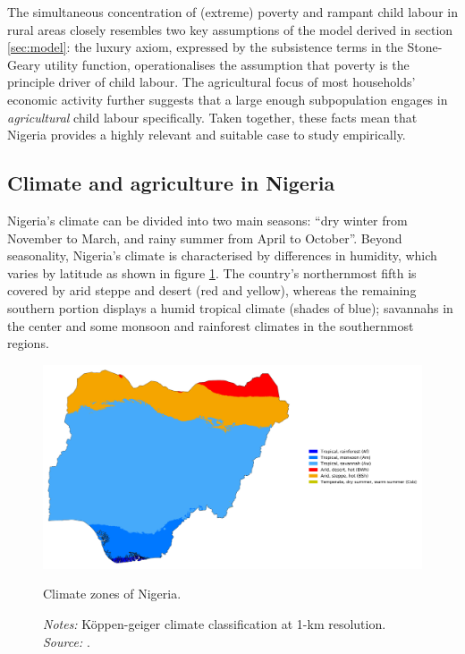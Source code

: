 \documentclass[a4paper,12pt]{article}
\theoremstyle{plain}
\theoremstyle{definition}
\theoremstyle{definition}
\theoremstyle{definition}
\theoremstyle{definition}
\begin{document}
The simultaneous concentration of (extreme) poverty and rampant child labour in rural areas closely resembles two key assumptions of the model derived in section \ref{sec:model}: the luxury axiom, expressed by the subsistence terms in the Stone-Geary utility function, operationalises the assumption that poverty is the principle driver of child labour. The agricultural focus of most households' economic activity further suggests that a large enough subpopulation engages in \textit{agricultural} child labour specifically. Taken together, these facts mean that Nigeria provides a highly relevant and suitable case to study empirically.

\subsection{Climate and agriculture in Nigeria}

Nigeria's climate can be divided into two main seasons: ``dry winter from November to March, and rainy summer from April to October''\citep[][p. 61]{shiru2019}. Beyond seasonality, Nigeria's climate is characterised by differences in humidity, which varies by latitude as shown in figure \ref{fig:climatezones}. The country's northernmost fifth is covered by arid steppe and desert (red and yellow), whereas the remaining southern portion displays a humid tropical climate (shades of blue); savannahs in the center and some monsoon and rainforest climates in the southernmost regions. 

\begin{figure}[h!]
    \centering
    \includegraphics[scale=0.33]{../outputs/climatezones.png}
    \caption{Climate zones of Nigeria.}
    \caption*{\footnotesize{\textit{Notes:} Köppen-geiger climate classification at 1-km resolution. \textit{Source:} \citet{Beck2018}.}}
    \label{fig:climatezones}
\end{figure}
\end{document}
